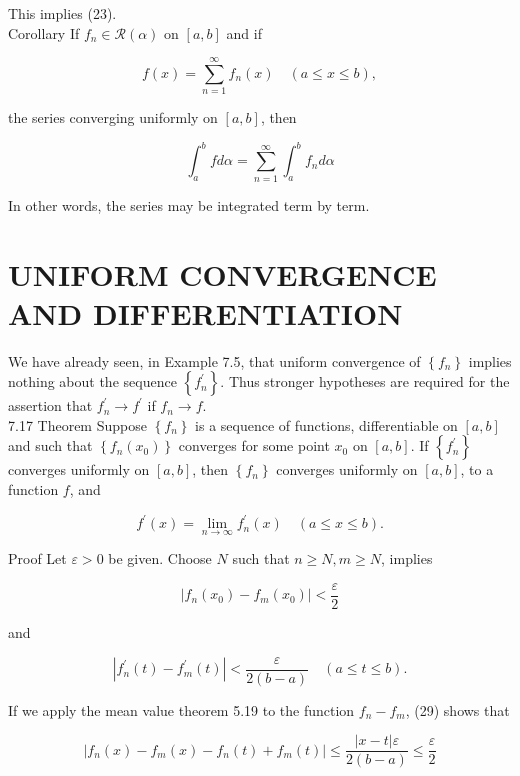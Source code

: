 \documentclass[10pt]{article}
\begin{document}
This implies (23).\\
Corollary If $f_{n} \in \mathscr{R}(\alpha)$ on $[a, b]$ and if

$$
f(x)=\sum_{n=1}^{\infty} f_{n}(x) \quad(a \leq x \leq b),
$$

the series converging uniformly on $[a, b]$, then

$$
\int_{a}^{b} f d \alpha=\sum_{n=1}^{\infty} \int_{a}^{b} f_{n} d \alpha
$$

In other words, the series may be integrated term by term.

\section*{UNIFORM CONVERGENCE AND DIFFERENTIATION}
We have already seen, in Example 7.5, that uniform convergence of $\left\{f_{n}\right\}$ implies nothing about the sequence $\left\{f_{n}^{\prime}\right\}$. Thus stronger hypotheses are required for the assertion that $f_{n}^{\prime} \rightarrow f^{\prime}$ if $f_{n} \rightarrow f$.\\
7.17 Theorem Suppose $\left\{f_{n}\right\}$ is a sequence of functions, differentiable on $[a, b]$ and such that $\left\{f_{n}\left(x_{0}\right)\right\}$ converges for some point $x_{0}$ on $[a, b]$. If $\left\{f_{n}^{\prime}\right\}$ converges uniformly on $[a, b]$, then $\left\{f_{n}\right\}$ converges uniformly on $[a, b]$, to a function $f$, and


\begin{equation*}
f^{\prime}(x)=\lim _{n \rightarrow \infty} f_{n}^{\prime}(x) \quad(a \leq x \leq b) . \tag{27}
\end{equation*}


Proof Let $\varepsilon>0$ be given. Choose $N$ such that $n \geq N, m \geq N$, implies


\begin{equation*}
\left|f_{n}\left(x_{0}\right)-f_{m}\left(x_{0}\right)\right|<\frac{\varepsilon}{2} \tag{28}
\end{equation*}


and


\begin{equation*}
\left|f_{n}^{\prime}(t)-f_{m}^{\prime}(t)\right|<\frac{\varepsilon}{2(b-a)} \quad(a \leq t \leq b) . \tag{29}
\end{equation*}


If we apply the mean value theorem 5.19 to the function $f_{n}-f_{m}$, (29) shows that


\begin{equation*}
\left|f_{n}(x)-f_{m}(x)-f_{n}(t)+f_{m}(t)\right| \leq \frac{|x-t| \varepsilon}{2(b-a)} \leq \frac{\varepsilon}{2} \tag{30}
\end{equation*}
\end{document}
